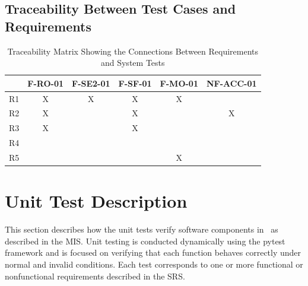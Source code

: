 \documentclass[12pt, titlepage]{article}
\begin{document}
\newpage
\subsection{Traceability Between Test Cases and Requirements}

\begin{table}[h!]
  \centering
  \begin{tabular}{|c|c|c|c|c|c|}
  \hline
    & F-RO-01 & F-SE2-01 & F-SF-01 & F-MO-01 & NF-ACC-01 \\
  \hline
  R1          &X &X &X & X& \\ \hline
  R2           &X & &X & &X \\ \hline
  R3         &X & &X & & \\ \hline
  R4   & & & & & \\ \hline
  R5      & & & &X & \\
  \hline
  \end{tabular}
  \caption{Traceability Matrix Showing the Connections Between Requirements and System Tests}
\end{table}


\section{Unit Test Description}\label{unit-test}




This section describes how the unit tests verify software components in \progname~as described in the MIS. Unit testing is conducted dynamically using the pytest framework and is focused on verifying that each function behaves correctly under normal and invalid conditions. Each test corresponds to one or more functional or nonfunctional requirements described in the SRS.
\end{document}

